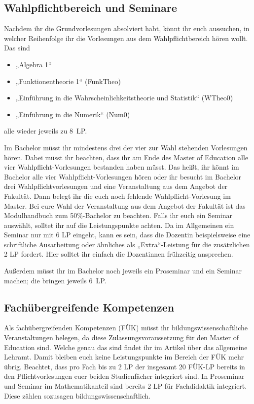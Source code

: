 \subsection{Wahlpflichtbereich und Seminare}

Nachdem ihr die Grundvorlesungen absolviert habt, könnt ihr euch aussuchen, in welcher Reihenfolge ihr die Vorlesungen aus dem Wahlpflichtbereich hören wollt. Das sind
\begin{itemize}
  \item „Algebra 1“
  \item „Funktionentheorie 1“ (\gls{FunkTheo})
  \item „Einführung in die Wahrscheinlichkeitstheorie und Statistik“ (\gls{WTheo0})
  \item „Einführung in die Numerik“ (\gls{Num0})
\end{itemize}
alle wieder jeweils zu 8~\gls{LP}. 

Im Bachelor müsst ihr mindestens drei der vier zur Wahl stehenden Vorlesungen hören. Dabei müsst ihr beachten, dass ihr am Ende des Master of Education alle vier Wahlpflicht-Vorlesungen bestanden haben müsst. Das heißt, ihr könnt im Bachelor alle vier Wahlpflicht-Vorlesungen hören oder ihr besucht im Bachelor drei Wahlpflichtvorlesungen und eine Veranstaltung aus dem Angebot der Fakultät. Dann belegt ihr die euch noch fehlende Wahlpflicht-Vorlesung im Master. Bei eure Wahl der Veranstaltung aus dem Angebot der Fakultät ist das Modulhandbuch zum 50\%-Bachelor zu beachten. Falls ihr euch ein Seminar auswählt, solltet ihr auf die Leistungspunkte achten. Da im Allgemeinen ein Seminar nur mit 6 \gls{LP} eingeht, kann es sein, dass die Dozentin beispielsweise eine schriftliche Ausarbeitung oder ähnliches als „Extra“-Leistung für die zusätzlichen 2 \gls{LP} fordert. Hier solltet ihr einfach die Dozentinnen frühzeitig ansprechen.

Außerdem müsst ihr im Bachelor noch jeweils ein Proseminar und ein Seminar machen; die bringen jeweils 6~\gls{LP}.

\subsection{Fachübergreifende Kompetenzen}

Als fachübergreifenden Kompetenzen (FÜK) müsst ihr bildungswissenschaftliche Veranstaltungen belegen, da diese Zulassungsvoraussetzung für den Master of Education sind. Welche genau das sind findet ihr im Artikel über das allgemeine Lehramt. Damit bleiben euch keine Leistungspunkte im Bereich der FÜK mehr übrig. Beachtet, dass pro Fach bis zu 2 \gls{LP} der insgesamt 20 FÜK-\gls{LP} bereits in den Pflichtvorlesungen euer beiden Studienfächer integriert sind. In Proseminar und Seminar im Mathematikanteil sind bereits 2 \gls{LP} für Fachdidaktik integriert. Diese zählen sozusagen bildungswissenschaftlich.

